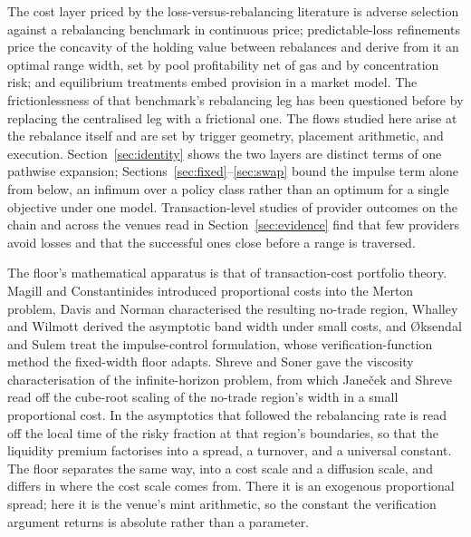 \documentclass[11pt,a4paper]{article}
\theoremstyle{definition}
\theoremstyle{plain}
\theoremstyle{remark}
\begin{document}
The cost layer priced by the loss-versus-rebalancing literature\cite{milionis2022,milionis2024} is adverse selection against a rebalancing benchmark in continuous price;
predictable-loss refinements\cite{cartea2024} price the concavity of the holding value between rebalances and derive from it an optimal range width, set by pool profitability net of gas and by 
concentration risk; and equilibrium treatments\cite{hasbrouck2026} embed provision in a market model. The frictionlessness of that benchmark's rebalancing leg has been
questioned before by replacing the centralised leg with a frictional one\cite{willetts2024}. The flows studied here arise at the rebalance itself and are set by trigger geometry, 
placement arithmetic, and execution. Section~\ref{sec:identity} shows the two layers are distinct terms of one pathwise expansion; Sections~\ref{sec:fixed}--\ref{sec:swap} bound the 
impulse term alone from below, an infimum over a policy class rather than an optimum for a single objective under one model. Transaction-level studies of provider outcomes on the 
chain and across the venues read in Section~\ref{sec:evidence} find that few providers avoid losses and that the successful ones close before a range is traversed\cite{urusov2026}.

The floor's mathematical apparatus is that of transaction-cost portfolio theory. Magill and Constantinides\cite{magill1976} introduced proportional costs into the Merton problem, 
Davis and Norman\cite{davisnorman1990} characterised the resulting no-trade region, Whalley and Wilmott\cite{whalleywilmott1997} derived the asymptotic band width under small costs, 
and \O ksendal and Sulem\cite{oksendalsulem2007} treat the impulse-control formulation, whose verification-function method the fixed-width floor adapts.
Shreve and Soner\cite{shrevesoner1994} gave the viscosity characterisation of the infinite-horizon problem, from which Jane\v{c}ek and Shreve\cite{janecekshreve2004} read off the cube-root
scaling of the no-trade region's width in a small proportional cost. In the asymptotics that followed the rebalancing rate is read off the local time of the risky fraction at that region's
boundaries, so that the liquidity premium factorises into a spread, a turnover, and a universal constant\cite{gerhold2014}. The floor separates the same way, into a cost scale and a 
diffusion scale, and differs in where the cost scale comes from. There it is an exogenous proportional spread; here it is the venue's mint arithmetic, so the constant the verification 
argument returns is absolute rather than a parameter.
\end{document}
